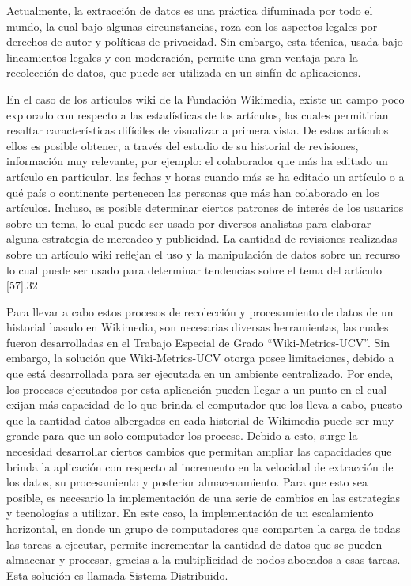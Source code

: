 Actualmente, la extracción de datos es una práctica difuminada por todo el mundo, la
cual bajo algunas circunstancias, roza con los aspectos legales por derechos de autor y
políticas de privacidad. Sin embargo, esta técnica, usada bajo lineamientos legales y con
moderación, permite una gran ventaja para la recolección de datos, que puede ser
utilizada en un sinfín de aplicaciones.

En el caso de los artículos wiki de la Fundación Wikimedia, existe un campo poco
explorado con respecto a las estadísticas de los artículos, las cuales permitirían resaltar
características difíciles de visualizar a primera vista. De estos artículos ellos es posible
obtener, a través del estudio de su historial de revisiones, información muy relevante,
por ejemplo: el colaborador que más ha editado un artículo en particular, las fechas y
horas cuando más se ha editado un artículo o a qué país o continente pertenecen las
personas que más han colaborado en los artículos. Incluso, es posible determinar ciertos
patrones de interés de los usuarios sobre un tema, lo cual puede ser usado por diversos
analistas para elaborar alguna estrategia de mercadeo y publicidad. La cantidad de
revisiones realizadas sobre un artículo wiki reflejan el uso y la manipulación de datos
sobre un recurso lo cual puede ser usado para determinar tendencias sobre el tema del
artículo [57].32

Para llevar a cabo estos procesos de recolección y procesamiento de datos de un
historial basado en Wikimedia, son necesarias diversas herramientas, las cuales fueron
desarrolladas en el Trabajo Especial de Grado “Wiki-Metrics-UCV”. Sin embargo, la solución
que Wiki-Metrics-UCV otorga posee limitaciones, debido a que está desarrollada para ser
ejecutada en un ambiente centralizado. Por ende, los procesos ejecutados por esta
aplicación pueden llegar a un punto en el cual exijan más capacidad de lo que brinda el
computador que los lleva a cabo, puesto que la cantidad datos albergados en cada
historial de Wikimedia puede ser muy grande para que un solo computador los procese.
Debido a esto, surge la necesidad desarrollar ciertos cambios que permitan ampliar
las capacidades que brinda la aplicación con respecto al incremento en la velocidad de
extracción de los datos, su procesamiento y posterior almacenamiento. Para que esto
sea posible, es necesario la implementación de una serie de cambios en las estrategias y
tecnologías a utilizar. En este caso, la implementación de un escalamiento horizontal, en
donde un grupo de computadores que comparten la carga de todas las tareas a ejecutar,
permite incrementar la cantidad de datos que se pueden almacenar y procesar, gracias a
la multiplicidad de nodos abocados a esas tareas. Esta solución es llamada Sistema
Distribuido.


